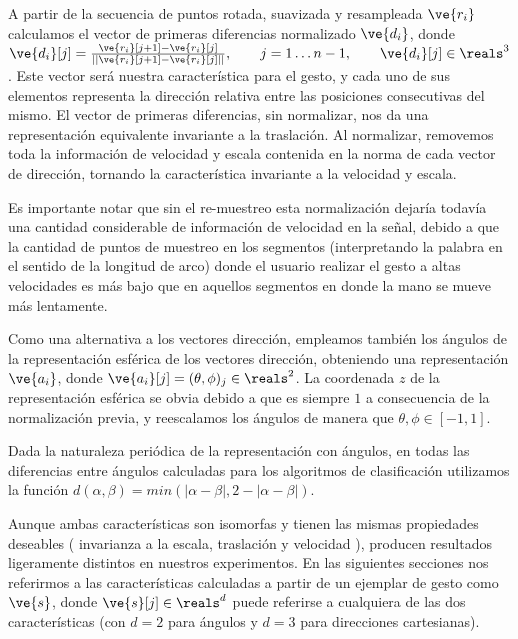 

A partir de la secuencia de puntos rotada, suavizada y resampleada $\ve{r_i}$ calculamos el vector de primeras diferencias normalizado $\ve{d_i}$, donde $\ve{d_i}[j]= \frac{\ve{r_i}[j+1]-\ve{r_i}[j]}{||\ve{r_i}[j+1]-\ve{r_i}[j]||}, \qquad j=1 \dots n-1,  \qquad \ve{d_i}[j] \in \reals^3 $. Este vector será nuestra característica para el gesto, y cada uno de sus elementos representa la dirección relativa entre las posiciones consecutivas del mismo. El vector de primeras diferencias, sin normalizar, nos da una representación equivalente invariante a la traslación. Al normalizar, removemos toda la información de velocidad y escala contenida en la norma de cada vector de dirección, tornando la característica invariante a la velocidad y escala. 

Es importante notar que sin el re-muestreo esta normalización dejaría todavía una cantidad considerable de información de velocidad en la señal, debido a que la cantidad de puntos de muestreo en los segmentos (interpretando la palabra en el sentido de la longitud de arco) donde el usuario realizar el gesto a altas velocidades es más bajo que en aquellos segmentos en donde la mano se mueve más lentamente.

Como una alternativa a los vectores dirección, empleamos también los ángulos de la representación esférica de los vectores dirección, obteniendo una representación $\ve{a_i}$, donde $\ve{a_i}[j]=(\theta,\phi)_j \in \reals^2$.  La coordenada $z$ de la representación esférica se obvia debido a que es siempre $1$ a consecuencia de la normalización previa, y reescalamos los ángulos de manera que  $\theta,\phi \in [-1,1]$.


Dada la naturaleza periódica de la representación con ángulos, en todas las diferencias entre ángulos calculadas para los algoritmos de clasificación utilizamos la función $ d(\alpha,\beta) = min(|\alpha-\beta|, 2- |\alpha-\beta|)$.

Aunque ambas características son isomorfas y tienen las mismas propiedades deseables ( invarianza a la escala, traslación y velocidad \cite{Kindratenko:2003}), producen resultados ligeramente distintos en nuestros experimentos. En las siguientes secciones nos referirmos a las características calculadas a partir de un ejemplar de gesto como $\ve{s}$, donde $\ve{s}[j] \in \reals^d$ puede referirse a cualquiera de las dos características (con $d=2$ para ángulos y $d=3$ para direcciones cartesianas). 


